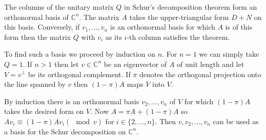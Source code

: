 \documentclass[12pt]{article}
\begin{document}
The columns of the unitary matrix $Q$ in Schur's decomposition theorem form an orthonormal basis of $\mathbb{C}^n$.  The matrix $A$ takes the upper-triangular form $D+N$ on this basis.  Conversely, if $v_1, \ldots, v_n$ is an orthonormal basis for which $A$ is of this form then the matrix $Q$ with $v_i$ as its $i$-th column satisfies the theorem.

To find such a basis we proceed by induction on $n$.  For $n=1$ we can simply take $Q=1$.  If $n > 1$ then let $v \in \mathbb{C}^n$ be an eigenvector of $A$ of unit length and let $V = v^{\perp}$ be its orthogonal complement.  If $\pi$ denotes the orthogonal projection onto the line spanned by $v$ then $(1-\pi)A$ maps $V$ into $V$.

By induction there is an orthonormal basis $v_2, \ldots, v_n$ of $V$ for which $(1-\pi)A$ takes the desired form on $V$.  Now $A = \pi A + (1-\pi)A$ so $Av_i \equiv (1-\pi)Av_i (\mod v)$ for $i \in \{2, \ldots, n\}$.  Then $v, v_2, \ldots, v_n$ can be used as a basis for the Schur decomposition on $\mathbb{C}^n$.
\end{document}
